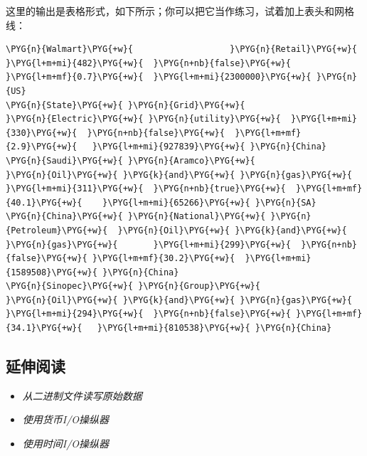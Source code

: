 
这里的输出是表格形式，如下所示；你可以把它当作练习，试着加上表头和网格线：



\begin{codeblockbg}
\begin{Verbatim}[commandchars=\\\{\},breaklines=true,breakanywhere=true,fontsize=\codefont,xleftmargin=17bp]
\PYG{n}{Walmart}\PYG{+w}{                   }\PYG{n}{Retail}\PYG{+w}{            }\PYG{l+m+mi}{482}\PYG{+w}{  }\PYG{n+nb}{false}\PYG{+w}{  }\PYG{l+m+mf}{0.7}\PYG{+w}{  }\PYG{l+m+mi}{2300000}\PYG{+w}{ }\PYG{n}{US}
\PYG{n}{State}\PYG{+w}{ }\PYG{n}{Grid}\PYG{+w}{                }\PYG{n}{Electric}\PYG{+w}{ }\PYG{n}{utility}\PYG{+w}{  }\PYG{l+m+mi}{330}\PYG{+w}{  }\PYG{n+nb}{false}\PYG{+w}{  }\PYG{l+m+mf}{2.9}\PYG{+w}{   }\PYG{l+m+mi}{927839}\PYG{+w}{ }\PYG{n}{China}
\PYG{n}{Saudi}\PYG{+w}{ }\PYG{n}{Aramco}\PYG{+w}{              }\PYG{n}{Oil}\PYG{+w}{ }\PYG{k}{and}\PYG{+w}{ }\PYG{n}{gas}\PYG{+w}{       }\PYG{l+m+mi}{311}\PYG{+w}{  }\PYG{n+nb}{true}\PYG{+w}{  }\PYG{l+m+mf}{40.1}\PYG{+w}{    }\PYG{l+m+mi}{65266}\PYG{+w}{ }\PYG{n}{SA}
\PYG{n}{China}\PYG{+w}{ }\PYG{n}{National}\PYG{+w}{ }\PYG{n}{Petroleum}\PYG{+w}{  }\PYG{n}{Oil}\PYG{+w}{ }\PYG{k}{and}\PYG{+w}{ }\PYG{n}{gas}\PYG{+w}{       }\PYG{l+m+mi}{299}\PYG{+w}{  }\PYG{n+nb}{false}\PYG{+w}{ }\PYG{l+m+mf}{30.2}\PYG{+w}{  }\PYG{l+m+mi}{1589508}\PYG{+w}{ }\PYG{n}{China}
\PYG{n}{Sinopec}\PYG{+w}{ }\PYG{n}{Group}\PYG{+w}{             }\PYG{n}{Oil}\PYG{+w}{ }\PYG{k}{and}\PYG{+w}{ }\PYG{n}{gas}\PYG{+w}{       }\PYG{l+m+mi}{294}\PYG{+w}{  }\PYG{n+nb}{false}\PYG{+w}{ }\PYG{l+m+mf}{34.1}\PYG{+w}{   }\PYG{l+m+mi}{810538}\PYG{+w}{ }\PYG{n}{China}
\end{Verbatim}
\end{codeblockbg}



\subsection{延伸阅读}



\begin{itemize}
\item \textit{从二进制文件读写原始数据}



\item \textit{使用货币I/O操纵器}



\item \textit{使用时间I/O操纵器}

\end{itemize}


